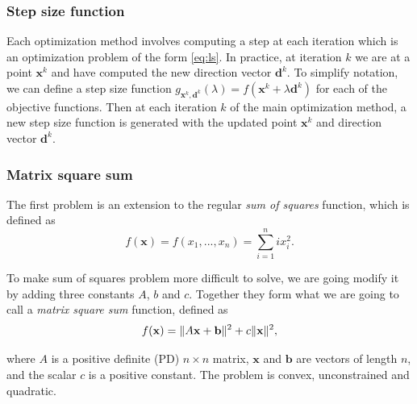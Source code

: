 \documentclass[english, 12pt, a4paper, sci, utf8, a-1b, online, table]{aaltothesis}
\newcommand{\vect}[1]{\ensuremath{\mathbf{#1}}}
\newcommand{\norm}[1]{\ensuremath\Vert #1 \Vert}
\begin{document}
\subsubsection{Step size function}

Each optimization method involves computing a step at each iteration which is an optimization problem of the form \eqref{eq:ls}. In practice, at iteration $k$ we are at a point $\vect{x}^k$ and have computed the new direction vector $\vect{d}^k$. To simplify notation, we can define a step size function $g_{\vect{x}^k, \vect{d}^k}(\lambda) = f(\vect{x}^k + \lambda \vect{d}^k)$ for each of the objective functions. Then at each iteration $k$ of the main optimization method, a new step size function is generated with the updated point $\vect{x}^k$ and direction vector $\vect{d}^k$.

\subsubsection{Matrix square sum}
\label{sect:matrix_square_sum}

The first problem is an extension to the regular \emph{sum of squares} function, which is defined as
\begin{equation}
    f(\mathbf{x})=f(x_1, ..., x_n)=\sum_{i=1}^{n}{ix_i^2}.
\end{equation}

To make sum of squares problem more difficult to solve, we are going modify it by adding three constants $A$, $b$ and $c$. Together they form what we are going to call a \emph{matrix square sum} function, defined as
\begin{equation}
    f(\vect{x}) = \norm{A \vect{x} + \vect{b}} ^ 2 + c \norm{\vect{x}} ^ 2,
\end{equation}

where $A$ is a positive definite (PD) $n \times n$ matrix, $\vect{x}$ and $\vect{b}$ are vectors of length $n$, and the scalar $c$ is a positive constant. The problem is convex, unconstrained and quadratic.
\end{document}
